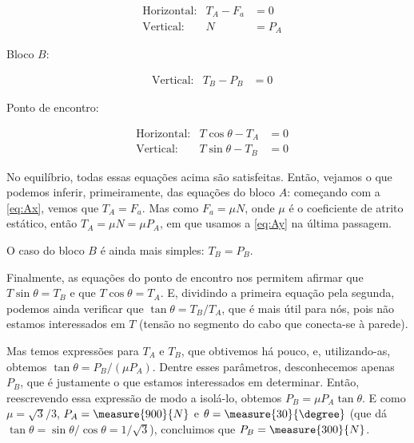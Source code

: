 \begin{question}
\begin{solution}
\begin{enumerate}
\begin{minipage}[t]{0.3\textwidth}

				\begin{align}
					&\text{Horizontal:}& T_A - F_a &= 0 \label{eq:Ax}\\
					&\text{Vertical:}& N &= P_A \label{eq:Ay}
				\end{align}
			\end{minipage}\hfill
			\begin{minipage}[t]{0.3\textwidth}
				\noindent
				Bloco $B$:


				\begin{align}
					&\text{Vertical:}& T_B - P_B &= 0 \label{eq:By}
				\end{align}
			\end{minipage}\hfill
			\begin{minipage}[t]{0.3\textwidth}
				\noindent
				Ponto de encontro:


				\begin{align}
					&\text{Horizontal:}& T \cos\theta - T_A &= 0 \label{eq:Cx} \\
					&\text{Vertical:}& T \sin\theta - T_B &= 0 \label{eq:Cy}
				\end{align}
			\end{minipage}

			\bigskip
			
			No equilíbrio, todas essas equações acima são satisfeitas.
			Então, vejamos o que podemos inferir, primeiramente, das equações do bloco $A$: começando com a \eqref{eq:Ax}, vemos que $T_A = F_a$.
			Mas como $F_a = \mu N$, onde $\mu$ é o coeficiente de atrito estático, então $T_A = \mu N = \mu P_A$, em que usamos a \eqref{eq:Ay} na última passagem.

			O caso do bloco $B$ é ainda mais simples: $T_B = P_B$.

			Finalmente, as equações do ponto de encontro nos permitem afirmar que $T \sin\theta = T_B$ e que $T \cos\theta = T_A$.
			E, dividindo a primeira equação pela segunda, podemos ainda verificar que $\tan\theta = T_B/T_A$, que é mais útil para nós, pois não estamos interessados em $T$ (tensão no segmento do cabo que conecta-se à parede).

			Mas temos expressões para $T_A$ e $T_B$, que obtivemos há pouco, e, utilizando-as, obtemos $\tan\theta = P_B/(\mu P_A)$.
			Dentre esses parâmetros, desconhecemos apenas $P_B$, que é justamente o que estamos interessados em determinar.
			Então, reescrevendo essa expressão de modo a isolá-lo, obtemos $P_B = \mu P_A \tan\theta$.
			E como $\mu = \sqrt{3}/3$, $P_A = \measure{900}{N}$ e $\theta = \measure{30}{\degree}$ (que dá $\tan\theta = \sin\theta/\cos\theta = 1/\sqrt{3}$), concluimos que $P_B = \measure{300}{N}$.


\end{enumerate}
\end{solution}
\end{question}
